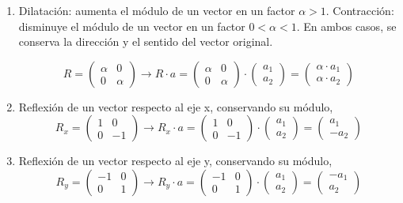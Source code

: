 \begin{enumerate}
\item Dilatación: aumenta el módulo de un vector en un factor $\alpha>1$. Contracción: disminuye el módulo de un vector en un factor $0<\alpha<1$. En ambos casos, se conserva la dirección y el sentido del vector original.
 
\begin{equation*}
R=\begin{pmatrix}
\alpha& 0\\
0& \alpha
\end{pmatrix} \rightarrow R\cdot a = \begin{pmatrix}
\alpha& 0\\
0& \alpha
\end{pmatrix} \cdot \begin{pmatrix}
a_1\\
a_2
\end{pmatrix}= \begin{pmatrix}
\alpha \cdot a_1\\
\alpha \cdot a_2
\end{pmatrix}
\end{equation*}

\item Reflexión de un vector respecto al eje x, conservando su módulo,
\begin{equation*}
R_x=\begin{pmatrix}
1& 0\\
0& -1
\end{pmatrix} \rightarrow R_x\cdot a = \begin{pmatrix}
1& 0\\
0& -1
\end{pmatrix} \cdot \begin{pmatrix}
a_1\\
a_2
\end{pmatrix}= \begin{pmatrix}
a_1\\
-a_2
\end{pmatrix}
\end{equation*}

\item Reflexión de un vector respecto al eje y, conservando su módulo,
\begin{equation*}
R_y=\begin{pmatrix}
-1& 0\\
0& 1
\end{pmatrix} \rightarrow R_y\cdot a = \begin{pmatrix}
-1& 0\\
0& 1
\end{pmatrix} \cdot \begin{pmatrix}
a_1\\
a_2
\end{pmatrix}= \begin{pmatrix}
-a_1\\
a_2
\end{pmatrix}
\end{equation*}


\end{enumerate}
